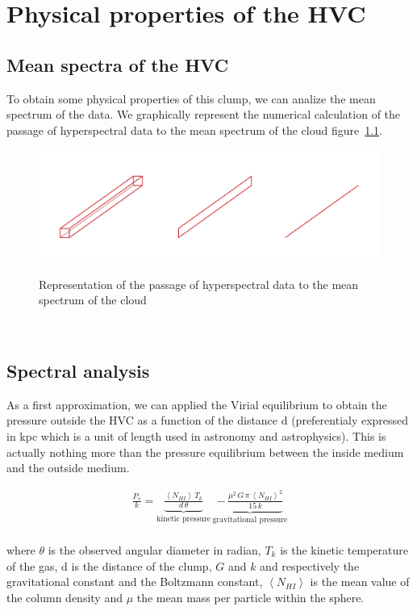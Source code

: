 \documentclass[a4paper,10.5pt]{report}
\begin{document}
\chapter{Physical properties of the HVC}
\section{Mean spectra of the HVC}
To obtain some physical properties of this clump, we can analize the mean spectrum of the data.
We graphically represent the numerical calculation of the passage of hyperspectral data to the mean spectrum of the cloud
figure~\ref{fig::spectra}.

\begin{figure}[h!]
  \centering
  \includegraphics[width=6.in]{spectra.png}
  \label{fig::spectra}
  \caption{Representation of the passage of hyperspectral data to the mean spectrum of the cloud}
\end{figure} \\

\section{Spectral analysis}
As a first approximation, we can applied the Virial equilibrium to obtain the pressure outside the HVC as a function
of the distance d (preferentialy expressed in kpc which is a unit of length used in astronomy and astrophysics). 
This is actually nothing more than the pressure equilibrium between the inside medium and the outside medium.

\begin{align}
  \frac{P_s}{k} = \underbrace{\frac{\left< N_{HI} \right> \, T_k}{d \, \theta}}_\text{kinetic pressure} \,  
  \underbrace{- \, \frac{\mu^2 \, G \, \pi \, \left< N_{HI} \right>^2}{15 \, k}}_\text{gravitational pressure}
\end{align}  \\
where $\theta$ is the observed angular diameter in radian, $T_k$ is the kinetic temperature of the gas, d is the distance of the clump, 
$G$ and $k$ and respectively the gravitational constant and the Boltzmann constant, $\left< N_{HI} \right>$ is the mean value 
of the column density and $\mu$ the mean mass per particle within the sphere. \\
\end{document}

